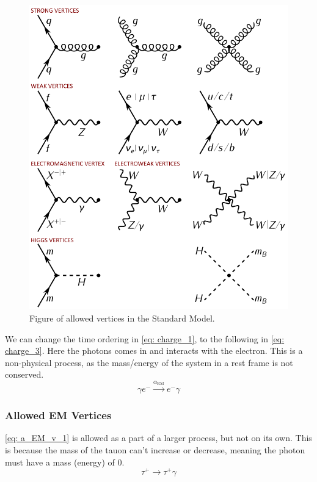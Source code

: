 \begin{figure}[h!]
\centering
\includegraphics[width = \textwidth]{feynman_diagram_vertices.png}
\caption{Figure of allowed vertices in the Standard Model.}
\label{fig: feynman_diagram_vertices}
\end{figure}


We can change the time ordering in \cref{eq: charge_1}, to the following in \cref{eq: charge_3}. Here the photons comes in and interacts with the electron. This is a non-physical process, as the mass/energy of the system in a rest frame is not conserved. 
\begin{equation}\label{eq: charge_3}
  γ e^{-} \stackrel{α_{\text{EM}}}{→} e^{-} γ
\end{equation}

\subsubsection{Allowed EM Vertices}
\cref{eq: a_EM_v_1} is allowed as a part of a larger process, but not on its own. This is because the mass of the tauon can't increase or decrease, meaning the photon must have a mass (energy) of 0.
\begin{equation}\label{eq: a_EM_v_1}
τ^{+} → τ^{+}γ
\end{equation}

